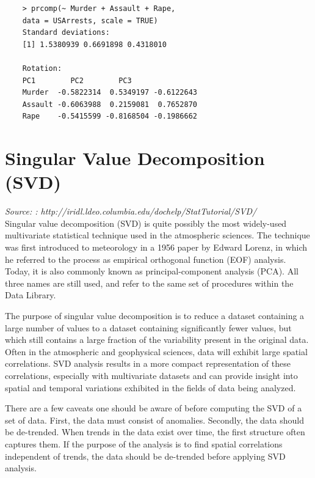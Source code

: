 \documentclass[]{article}
\begin{document}
\newpage
\begin{framed}
	\begin{verbatim}
	> prcomp(~ Murder + Assault + Rape, 
	data = USArrests, scale = TRUE)
	Standard deviations:
	[1] 1.5380939 0.6691898 0.4318010
	
	Rotation:
	PC1        PC2        PC3
	Murder  -0.5822314  0.5349197 -0.6122643
	Assault -0.6063988  0.2159081  0.7652870
	Rape    -0.5415599 -0.8168504 -0.1986662
	\end{verbatim}
\end{framed}
\newpage
\section{Singular Value Decomposition (SVD)}
\textit{Source: : http://iridl.ldeo.columbia.edu/dochelp/StatTutorial/SVD/ \\}
Singular value decomposition (SVD) is quite possibly the most widely-used multivariate statistical technique used in the atmospheric sciences. The technique was first introduced to meteorology in a 1956 paper by Edward Lorenz, in which he referred to the process as empirical orthogonal function (EOF) analysis. Today, it is also commonly known as principal-component analysis (PCA). All three names are still used, and refer to the same set of procedures within the Data Library. 


The purpose of singular value decomposition is to reduce a dataset containing a large number of values to a dataset containing significantly fewer values, but which still contains a large fraction of the variability present in the original data. Often in the atmospheric and geophysical sciences, data will exhibit large spatial correlations. SVD analysis results in a more compact representation of these correlations, especially with multivariate datasets and can provide insight into spatial and temporal variations exhibited in the fields of data being analyzed. 


There are a few caveats one should be aware of before computing the SVD of a set of data. First, the data must consist of anomalies. Secondly, the data should be de-trended. When trends in the data exist over time, the first structure often captures them. If the purpose of the analysis is to find spatial correlations independent of trends, the data should be de-trended before applying SVD analysis. 

\newpage
\end{document}

